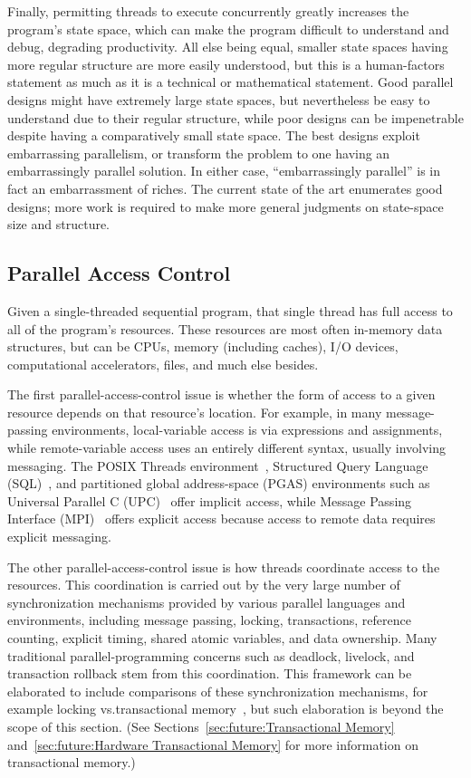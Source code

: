 Finally, permitting threads to execute concurrently greatly increases
the program's state space, which can make the program difficult to
understand and debug, degrading productivity.
All else being equal, smaller state spaces having more regular structure
are more easily understood, but this is a human-factors statement as much
as it is a technical or mathematical statement.
Good parallel designs might have extremely large state spaces, but
nevertheless be easy to understand due to their regular structure,
while poor designs can be impenetrable despite having a comparatively
small state space.
The best designs exploit embarrassing parallelism, or transform the
problem to one having an embarrassingly parallel solution.
In either case, ``embarrassingly parallel'' is in fact
an embarrassment of riches.
The current state of the art enumerates good designs; more work is
required to make more general judgments on
state-space size and structure.

\subsection{Parallel Access Control}
\label{sec:Parallel Access Control}

Given a single-threaded sequential program, that single
thread has full access to all of the program's resources.
These resources are most often in-memory data structures, but can be CPUs,
memory (including caches), I/O devices, computational accelerators, files,
and much else besides.

The first parallel-access-control issue is whether the form of access to
a given resource depends on that resource's location.
For example, in many message-passing environments, local-variable
access is via expressions and assignments,
while remote-variable access uses an entirely different
syntax, usually involving messaging.
The POSIX Threads environment~\cite{OpenGroup1997pthreads},
Structured Query Language (SQL)~\cite{DIS9075SQL92}, and
partitioned global address-space (PGAS) environments
such as Universal Parallel C (UPC)~\cite{ElGhazawi2003UPC,UPCConsortium2013}
offer implicit access,
while Message Passing Interface (MPI)~\cite{MPIForum2008} offers
explicit access because access to remote data requires explicit
messaging.

The other parallel-access-control issue is how threads coordinate
access to the resources.
This coordination is carried out by
the very large number of synchronization mechanisms
provided by various parallel languages and environments,
including message passing, locking, transactions,
reference counting, explicit timing, shared atomic variables, and data
ownership.
Many traditional parallel-programming concerns such as deadlock,
livelock, and transaction rollback stem from this coordination.
This framework can be elaborated to include comparisons
of these synchronization mechanisms, for example locking vs.\@ transactional
memory~\cite{McKenney2007PLOSTM}, but such elaboration is beyond the
scope of this section.
(See
Sections~\ref{sec:future:Transactional Memory}
and~\ref{sec:future:Hardware Transactional Memory}
for more information on transactional memory.)

